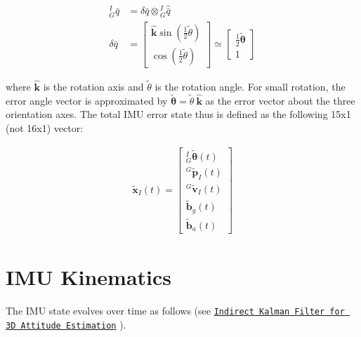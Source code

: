 \begin{align*} ^I_G\bar{q} &= \delta \bar{q} \otimes \text{}^I_G \hat{\bar{q}}\\ \delta \bar{q} &= \begin{bmatrix} \hat{\mathbf{k}}\sin(\frac{1}{2}\tilde{\theta})\\ \cos(\frac{1}{2}\tilde{\theta}) \end{bmatrix} \simeq \begin{bmatrix} \frac{1}{2}\tilde{\boldsymbol{\theta}}\\ 1 \end{bmatrix} \end{align*}

where $\hat{\mathbf{k}}$ is the rotation axis and $\tilde{\theta}$ is the rotation angle. For small rotation, the error angle vector is approximated by $\tilde{\boldsymbol{\theta}} = \tilde{\theta}~\hat{\mathbf{k}}$ as the error vector about the three orientation axes. The total I\+MU error state thus is defined as the following 15x1 (not 16x1) vector\+:

\begin{align*} \tilde{\mathbf{x}}_I(t) = \begin{bmatrix} ^I_G\tilde{\boldsymbol{\theta}}(t) \\ ^G\tilde{\mathbf{p}}_I(t) \\ ^G\tilde{\mathbf{v}}_I(t)\\ \tilde{\mathbf{b}}_{{g}}(t) \\ \tilde{\mathbf{b}}_{{a}}(t) \end{bmatrix} \end{align*}\hypertarget{propagation_imu_kinematic}{}\section{I\+M\+U Kinematics}\label{propagation_imu_kinematic}
The I\+MU state evolves over time as follows (see \href{http://mars.cs.umn.edu/tr/reports/Trawny05b.pdf}{\tt Indirect Kalman Filter for 3D Attitude Estimation} \cite{Trawny2005TR}).

